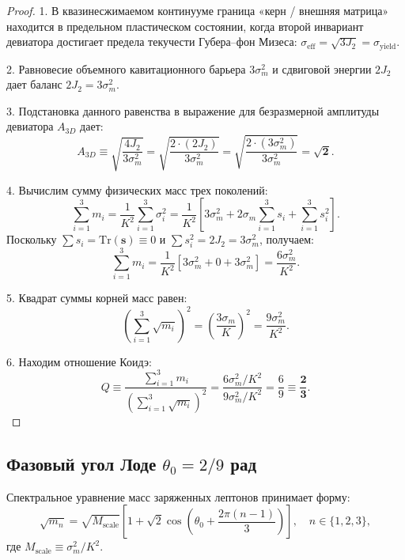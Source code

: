 \documentclass[11pt,a4paper]{article}
\theoremstyle{definition}
\theoremstyle{remark}
\begin{document}
\begin{proof}
1. В квазинесжимаемом континууме граница «керн / внешняя матрица» находится в предельном пластическом состоянии, когда второй инвариант девиатора достигает предела текучести Губера--фон Мизеса: $\sigma_{\mathrm{eff}} = \sqrt{3 J_2} = \sigma_{\mathrm{yield}}$.

2. Равновесие объемного кавитационного барьера $3\sigma_m^2$ и сдвиговой энергии $2J_2$ дает баланс $2 J_2 = 3 \sigma_m^2$.

3. Подстановка данного равенства в выражение для безразмерной амплитуды девиатора $A_{3D}$ дает:
\begin{equation}
    A_{3D} \equiv \sqrt{\frac{4 J_2}{3 \sigma_m^2}} = \sqrt{\frac{2 \cdot (2 J_2)}{3 \sigma_m^2}} = \sqrt{\frac{2 \cdot (3 \sigma_m^2)}{3 \sigma_m^2}} = \boldsymbol{\sqrt{2}}.
\end{equation}

4. Вычислим сумму физических масс трех поколений:
\begin{equation}
    \sum_{i=1}^3 m_i = \frac{1}{K^2} \sum_{i=1}^3 \sigma_i^2 = \frac{1}{K^2} \left[ 3 \sigma_m^2 + 2\sigma_m \sum_{i=1}^3 s_i + \sum_{i=1}^3 s_i^2 \right].
\end{equation}
Поскольку $\sum s_i = \mathrm{Tr}(\mathbf{s}) \equiv 0$ и $\sum s_i^2 = 2 J_2 = 3 \sigma_m^2$, получаем:
\begin{equation}
    \sum_{i=1}^3 m_i = \frac{1}{K^2} \left[ 3 \sigma_m^2 + 0 + 3 \sigma_m^2 \right] = \frac{6 \sigma_m^2}{K^2}.
\end{equation}

5. Квадрат суммы корней масс равен:
\begin{equation}
    \left( \sum_{i=1}^3 \sqrt{m_i} \right)^2 = \left( \frac{3 \sigma_m}{K} \right)^2 = \frac{9 \sigma_m^2}{K^2}.
\end{equation}

6. Находим отношение Коидэ:
\begin{equation}
    Q \equiv \frac{\sum_{i=1}^3 m_i}{\left( \sum_{i=1}^3 \sqrt{m_i} \right)^2} = \frac{6 \sigma_m^2 / K^2}{9 \sigma_m^2 / K^2} = \frac{6}{9} \equiv \boldsymbol{\frac{2}{3}}.
\end{equation}
\end{proof}

\subsection{Фазовый угол Лоде $\theta_0 = 2/9$ рад}
Спектральное уравнение масс заряженных лептонов принимает форму:
\begin{equation}
    \sqrt{m_n} = \sqrt{M_{\mathrm{scale}}} \left[ 1 + \sqrt{2} \cos\left( \theta_0 + \frac{2\pi(n-1)}{3} \right) \right], \quad n \in \{1, 2, 3\},
    \label{eq:koide_mass_formula}
\end{equation}
где $M_{\mathrm{scale}} \equiv \sigma_m^2 / K^2$. 
\end{document}
